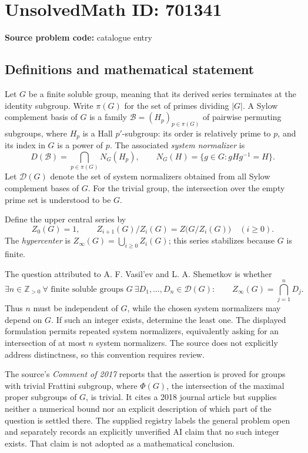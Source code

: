 \documentclass[11pt]{article}
\newcommand{\Z}{\mathbb{Z}}
\begin{document}
\section*{UnsolvedMath ID: 701341}
\textbf{Source problem code:} catalogue entry
\subsection{Definitions and mathematical statement}
Let \(G\) be a finite soluble group, meaning that its derived series terminates at the identity subgroup. Write \(\pi(G)\) for the set of primes dividing \(|G|\). A Sylow complement basis of \(G\) is a family \(\mathcal B=(H_p)_{p\in\pi(G)}\) of pairwise permuting subgroups, where \(H_p\) is a Hall \(p'\)-subgroup: its order is relatively prime to \(p\), and its index in \(G\) is a power of \(p\). The associated \emph{system normalizer} is
\[
D(\mathcal B)=\bigcap_{p\in\pi(G)}N_G(H_p),
\qquad N_G(H)=\{g\in G:gHg^{-1}=H\}.
\]
Let \(\mathcal D(G)\) denote the set of system normalizers obtained from all Sylow complement bases of \(G\). For the trivial group, the intersection over the empty prime set is understood to be \(G\).

Define the upper central series by
\[
Z_0(G)=1,\qquad Z_{i+1}(G)/Z_i(G)=Z\bigl(G/Z_i(G)\bigr)\quad(i\geq 0).
\]
The \emph{hypercenter} is \(Z_\infty(G)=\bigcup_{i\geq0}Z_i(G)\); this series stabilizes because \(G\) is finite.

The question attributed to A. F. Vasil'ev and L. A. Shemetkov is whether
\[
\exists n\in\Z_{>0}\ \forall\text{ finite soluble groups }G\
\exists D_1,\ldots,D_n\in\mathcal D(G):\qquad
Z_\infty(G)=\bigcap_{j=1}^{n}D_j.
\]
Thus \(n\) must be independent of \(G\), while the chosen system normalizers may depend on \(G\). If such an integer exists, determine the least one. The displayed formulation permits repeated system normalizers, equivalently asking for an intersection of at most \(n\) system normalizers. The source does not explicitly address distinctness, so this convention requires review.

The source's \emph{Comment of 2017} reports that the assertion is proved for groups with trivial Frattini subgroup, where \(\Phi(G)\), the intersection of the maximal proper subgroups of \(G\), is trivial. It cites a 2018 journal article but supplies neither a numerical bound nor an explicit description of which part of the question is settled there. The supplied registry labels the general problem open and separately records an explicitly unverified AI claim that no such integer exists. That claim is not adopted as a mathematical conclusion.
\end{document}
